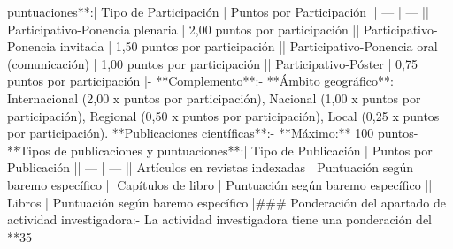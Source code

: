 \documentclass{article}
\begin{document}
\begin{itemize}
puntuaciones**:\n     | Tipo de Participación | Puntos por Participación |\n     | --- | --- |\n     | Participativo-Ponencia plenaria | 2,00 puntos por participación |\n     | Participativo-Ponencia invitada | 1,50 puntos por participación |\n     | Participativo-Ponencia oral (comunicación) | 1,00 puntos por participación |\n     | Participativo-Póster | 0,75 puntos por participación |\n   - **Complemento**:\n     - **Ámbito geográfico**: Internacional (2,00 x puntos por participación), Nacional (1,00 x puntos por participación), Regional (0,50 x puntos por participación), Local (0,25 x puntos por participación)\n{}. **Publicaciones científicas**:\n   - **Máximo:** 100 puntos\n   - **Tipos de publicaciones y puntuaciones**:\n     | Tipo de Publicación | Puntos por Publicación |\n     | --- | --- |\n     | Artículos en revistas indexadas | Puntuación según baremo específico |\n     | Capítulos de libro | Puntuación según baremo específico |\n     | Libros | Puntuación según baremo específico |\n\n### Ponderación del apartado de actividad investigadora:\n- La actividad investigadora tiene una ponderación del **35%
\end{itemize}
\end{document}
